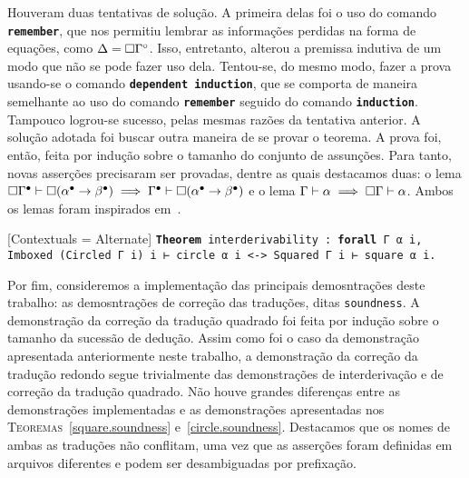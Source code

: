 \vspace{0.5\baselineskip}
Houveram duas tentativas de solução.
A primeira delas foi o uso do comando \texttt{\textbf{remember}}, que nos permitiu lembrar as informações perdidas na forma de equações, como $\Delta=\Box\Gamma^\circ$.
Isso, entretanto, alterou a premissa indutiva de um modo que não se pode fazer uso dela.
Tentou-se, do mesmo modo, fazer a prova usando-se o comando \texttt{\textbf{dependent induction}}, que se comporta de maneira semelhante ao uso do comando \texttt{\textbf{remember}} seguido do comando \texttt{\textbf{induction}}.
Tampouco logrou-se sucesso, pelas mesmas razões da tentativa anterior.
A solução adotada foi buscar outra maneira de se provar o teorema.
A prova foi, então, feita por indução sobre o tamanho do conjunto de assunções.
Para tanto, novas asserções precisaram ser provadas, dentre as quais destacamos duas: o lema
$\Box\Gamma^\bullet\mathrel{\vdash}\Box(\alpha^\bullet\to\beta^\bullet)\implies\Gamma^\bullet\mathrel{\vdash}\Box(\alpha^\bullet\to\beta^\bullet)$ e o lema $\Gamma\mathrel{\vdash}\alpha\implies\Box\Gamma\mathrel{\vdash}\alpha$.
Ambos os lemas foram inspirados em~\cite{Troelstra+Schwichtenberg.2000}.

\vspace{0.5\baselineskip}
\begin{tcolorbox}[enhanced jigsaw, breakable, sharp corners, colframe=black, colback=white, boxrule=0.5pt, left=1.5mm, right=1.5mm, top=1.5mm, bottom=1.5mm]
\setmonofont{Fira Code}[Contextuals = Alternate]
\texttt{\noindent\footnotesize\textbf{Theorem} interderivability : \textbf{forall} Γ α i,\\Imboxed (Circled Γ i) i ⊢ circle α i <-> Squared Γ i ⊢ square α i.}
\end{tcolorbox}

\vspace{0.5\baselineskip}
Por fim, consideremos a implementação das principais demosntrações deste trabalho: as demosntrações de correção das traduções, ditas \texttt{{soundness}}.
A demonstração da correção da tradução quadrado foi feita por indução sobre o tamanho da sucessão de dedução.
Assim como foi o caso da demonstração apresentada anteriormente neste trabalho, a demonstração da correção da tradução redondo segue trivialmente das demonstrações de interderivação e de correção da tradução quadrado.
Não houve grandes diferenças entre as demonstrações implementadas e as demonstrações apresentadas nos \textsc{Teoremas}~\ref{square.soundness} e~\ref{circle.soundness}.
Destacamos que os nomes de ambas as traduções não conflitam, uma vez que as asserções foram definidas em arquivos diferentes e podem ser desambiguadas por prefixação.

